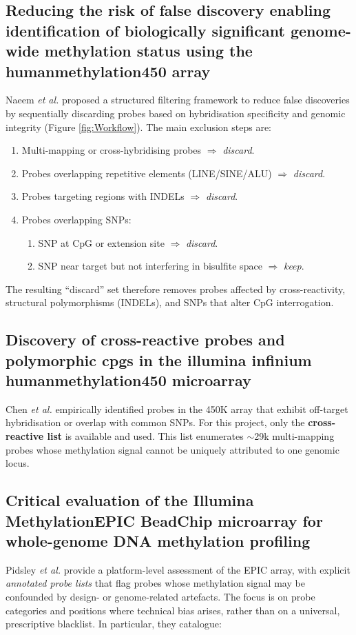 \documentclass[10pt]{extarticle}
\begin{document}
\subsection{Reducing the risk of false discovery enabling identification of biologically significant genome-wide methylation status using the humanmethylation450 array}
\label{app:naeem2014}



Naeem \emph{et al.} \cite{naeem2014} proposed a structured filtering framework to reduce false discoveries by sequentially discarding probes based on hybridisation specificity and genomic integrity (Figure \ref{fig:Workflow}).  
The main exclusion steps are:
\begin{enumerate}[label=-]
  \item Multi-mapping or cross-hybridising probes $\Rightarrow$ \textit{discard}.
  \item Probes overlapping repetitive elements (LINE/SINE/ALU) $\Rightarrow$ \textit{discard}.
  \item Probes targeting regions with INDELs $\Rightarrow$ \textit{discard}.
  \item Probes overlapping SNPs:
    \begin{enumerate}[label=--]
      \item SNP at CpG or extension site $\Rightarrow$ \textit{discard}.
      \item SNP near target but not interfering in bisulfite space $\Rightarrow$ \textit{keep}.
    \end{enumerate}
\end{enumerate}
The resulting ``discard'' set therefore removes probes affected by cross-reactivity, structural polymorphisms (INDELs), and SNPs that alter CpG interrogation.

\subsection{Discovery of cross-reactive probes and polymorphic cpgs in the illumina infinium humanmethylation450 microarray}
\label{app:chen2013}
Chen \emph{et al.} \cite{chen2013} empirically identified probes in the 450K array that exhibit off-target hybridisation or overlap with common SNPs.  
For this project, only the \textbf{cross-reactive list} is available and used.  
This list enumerates $\sim$29k multi-mapping probes whose methylation signal cannot be uniquely attributed to one genomic locus.

\subsection{Critical evaluation of the Illumina MethylationEPIC BeadChip microarray for whole-genome DNA methylation profiling}
\label{app:pidsley2016}
Pidsley \emph{et al.} \cite{pidsley2016} provide a platform-level assessment of the EPIC array, with explicit \emph{annotated probe lists} that flag probes whose methylation signal may be confounded by design- or genome-related artefacts. The focus is on probe categories and positions where technical bias arises, rather than on a universal, prescriptive blacklist. In particular, they catalogue:
\end{document}
